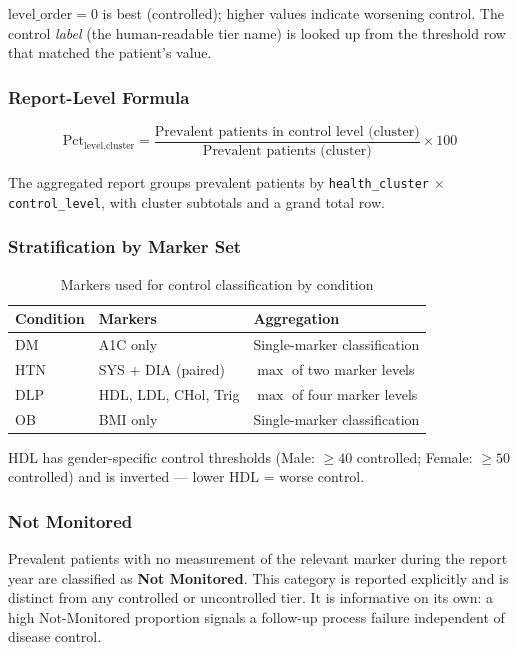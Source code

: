 \documentclass[11pt,a4paper]{article}
\begin{document}
$\text{level\_order} = 0$ is best (controlled); higher values indicate worsening control. The control \textit{label} (the human-readable tier name) is looked up from the threshold row that matched the patient's value.

\subsubsection{Report-Level Formula}

\begin{equation}
\text{Pct}_{\text{level}, \text{cluster}} =
\frac{\text{Prevalent patients in control level (cluster)}}
     {\text{Prevalent patients (cluster)}} \times 100
\end{equation}

The aggregated report groups prevalent patients by \texttt{health\_cluster} $\times$ \texttt{control\_level}, with cluster subtotals and a grand total row.

\subsubsection{Stratification by Marker Set}

\begin{table}[ht]
\centering
\caption{Markers used for control classification by condition}
\begin{tabular}{@{}lll@{}}
\toprule
\textbf{Condition} & \textbf{Markers} & \textbf{Aggregation} \\
\midrule
DM  & A1C only & Single-marker classification \\
HTN & SYS + DIA (paired) & $\max$ of two marker levels \\
DLP & HDL, LDL, CHol, Trig & $\max$ of four marker levels \\
OB  & BMI only & Single-marker classification \\
\bottomrule
\end{tabular}
\end{table}

HDL has gender-specific control thresholds (Male: $\geq 40$ controlled; Female: $\geq 50$ controlled) and is inverted --- lower HDL = worse control.

\subsubsection{Not Monitored}

Prevalent patients with no measurement of the relevant marker during the report year are classified as \textbf{Not Monitored}. This category is reported explicitly and is distinct from any controlled or uncontrolled tier. It is informative on its own: a high Not-Monitored proportion signals a follow-up process failure independent of disease control.
\end{document}
